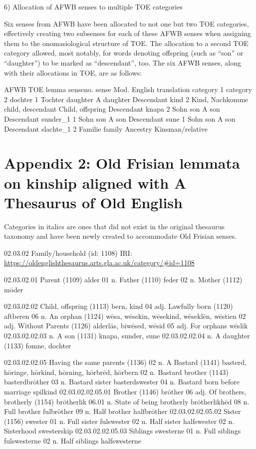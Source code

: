 6) Allocation of AFWB senses to multiple TOE categories

Six senses from AFWB have been allocated to not one but two TOE categories, effectively creating two subsenses for each of these AFWB senses when assigning them to the onomasiological structure of TOE. The allocation to a second TOE category allowed, most notably, for words denoting offspring (such as “son” or “daughter”) to be marked as “descendant”, too. The six AFWB senses, along with their allocations in TOE, are as follows:

	
AFWB	TOE
lemma	senseno.	sense	Mod. English translation	category 1	category 2
dochter	1 	Tochter	daughter	A daughter  	Descendant 
kind	2 	Kind, Nachkomme	child, descendant	Child, offspring 	Descendant
knapa	2 	Sohn	son	A son 	Descendant
sunder\_1	1	Sohn	son	A son	Descendant
sune	1	Sohn	son	A son	Descendant
slachte\_1	2	Familie	family	Ancestry 	Kinsman/relative 

\section{Appendix 2: Old Frisian lemmata on kinship aligned with A Thesaurus of Old English}
Categories in italics are ones that did not exist in the original thesaurus taxonomy and have been newly created to accommodate Old Frisian senses.

02.03.02 Family/household (id: 1108) 
IRI: \url{https://oldenglishthesaurus.arts.gla.ac.uk/category/#id=1108}

02.03.02.01 Parent (1109)	alder
	01 n. Father (1110)		feder
	02 n. Mother (1112)	mōder
	
02.03.02.02 Child, offspring (1113)		bern, kind
	04 adj. Lawfully born (1120)		aftberen
	06 n. An orphan (1124)		wēsa, wēsekin, wēsekind, wēseklēn, wēstien
		02 adj. Without Parents (1126)		alderlās, biwēsed, wēsid
		05 adj. For orphans		wēslik
	02.03.02.02.03 n. A son (1131)		knapa, sunder, sune
02.03.02.02.04 n. A daughter (1133)		fomne, dochter

02.03.02.02.05 Having the same parents (1136)		
02 n. A Bastard (1141)		basterd, hōringe, hōrkind, hōrning, hōrbrēd, hōrbern
		02 n. Bastard brother (1143)		basterdbrōther
		03 n. Bastard sister		basterdswester
		04 n. Bastard born before marriage	spilkind
02.03.02.02.05.01 Brother (1146)		brōther
		06 adj. Of brothers, brotherly (1154)		brōtherlik
		06.01 n. State of being brotherly		brōtherlikhēd
		08 n. Full brother		fulbrōther
		09 n. Half brother		halfbrōther
02.03.02.02.05.02 Sister (1156)		swester
		01 n. Full sister		fulswester
		02 n. Half sister		halfswester
		02 n. Sisterhood		swesterskip
		02.03.02.02.05.03 Siblings 		swesterne
			01 n. Full siblings		fulswesterne
			02 n. Half siblings		halfswesterne


